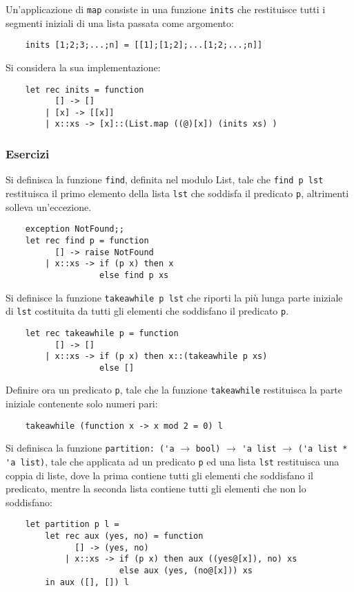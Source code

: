 \documentclass{article}
\numberwithin{equation}{subsection}
\begin{document}
Un'applicazione di \verb|map| consiste in una funzione \verb|inits| che restituisce tutti i segmenti iniziali di una lista passata come argomento:
\begin{verbatim}
    inits [1;2;3;...;n] = [[1];[1;2];...[1;2;...;n]]
\end{verbatim}
Si considera la sua implementazione:
\begin{verbatim}
    let rec inits = function
          [] -> []
        | [x] -> [[x]]
        | x::xs -> [x]::(List.map ((@)[x]) (inits xs) )
\end{verbatim}

\subsubsection*{Esercizi}

Si definisca la funzione \verb|find|, definita nel modulo List, tale che \verb|find p lst| restituisca il primo elemento della lista \verb|lst| che soddisfa il predicato \verb|p|, altrimenti solleva un'eccezione. 
\begin{verbatim}
    exception NotFound;;
    let rec find p = function
          [] -> raise NotFound
        | x::xs -> if (p x) then x
                   else find p xs
\end{verbatim}

Si definisce la funzione \verb|takeawhile p lst| che riporti la più lunga parte iniziale di \verb|lst| costituita da tutti gli elementi che soddisfano il predicato \verb|p|. 
\begin{verbatim}
    let rec takeawhile p = function
          [] -> []
        | x::xs -> if (p x) then x::(takeawhile p xs)
                   else []
\end{verbatim}
Definire ora un predicato \verb|p|, tale che la funzione \verb|takeawhile| restituisca la parte iniziale contenente solo numeri pari:
\begin{verbatim}
    takeawhile (function x -> x mod 2 = 0) l    
\end{verbatim}

Si definisca la funzione \verb|partition: ('a| $\rightarrow$ \verb|bool)| $\rightarrow$ \verb|'a list| $\rightarrow$ \verb|('a list * 'a list)|, tale che applicata ad un predicato \verb|p| ed una lista \verb|lst| restituisca una coppia di liste, dove la prima contiene tutti gli elementi che soddisfano il predicato, mentre la seconda lista contiene tutti gli elementi che non lo soddisfano:
\begin{verbatim}
    let partition p l =
        let rec aux (yes, no) = function
              [] -> (yes, no)
            | x::xs -> if (p x) then aux ((yes@[x]), no) xs
                       else aux (yes, (no@[x])) xs
        in aux ([], []) l    
\end{verbatim}
\end{document}
